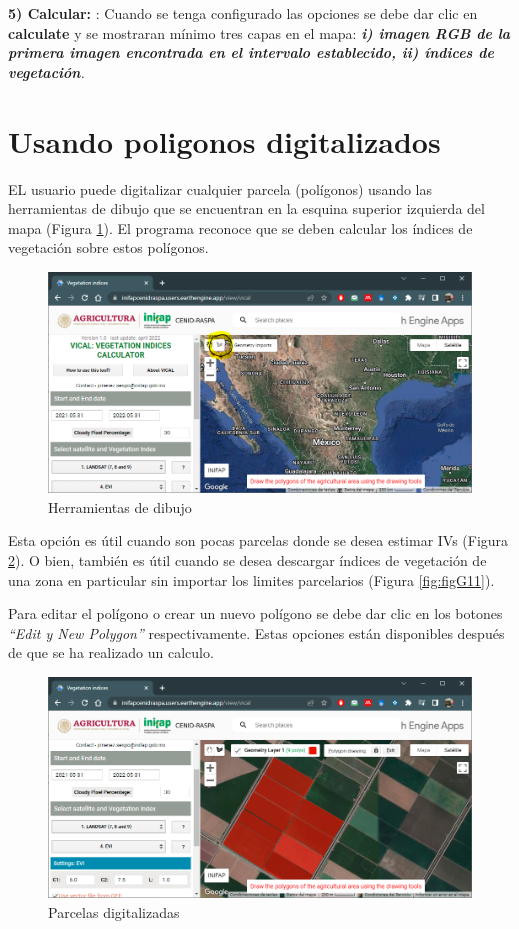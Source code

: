 \documentclass[
]{book}
\begin{document}
\textbf{5) Calcular: }: Cuando se tenga configurado las opciones se debe dar clic en \textbf{calculate} y se mostraran mínimo tres capas en el mapa: \emph{\textbf{i) imagen RGB de la primera imagen encontrada en el intervalo establecido, ii) índices de vegetación}. }

\hypertarget{usando-poligonos-digitalizados}{%
\section{Usando poligonos digitalizados}\label{usando-poligonos-digitalizados}}

EL usuario puede digitalizar cualquier parcela (polígonos) usando las herramientas de dibujo que se encuentran en la esquina superior izquierda del mapa (Figura \ref{fig:figG9}). El programa reconoce que se deben calcular los índices de vegetación sobre estos polígonos.

\begin{figure}

{\centering \includegraphics[width=0.75\linewidth]{./images/Figure11} 

}

\caption{Herramientas de dibujo}\label{fig:figG9}
\end{figure}

Esta opción es útil cuando son pocas parcelas donde se desea estimar IVs (Figura \ref{fig:figG10}). O bien, también es útil cuando se desea descargar índices de vegetación de una zona en particular sin importar los limites parcelarios (Figura \ref{fig:figG11}).

Para editar el polígono o crear un nuevo polígono se debe dar clic en los botones \emph{``Edit y New Polygon''} respectivamente. Estas opciones están disponibles después de que se ha realizado un calculo.

\begin{figure}

{\centering \includegraphics[width=0.75\linewidth]{./images/Figure12} 

}

\caption{Parcelas digitalizadas}\label{fig:figG10}
\end{figure}
\end{document}
